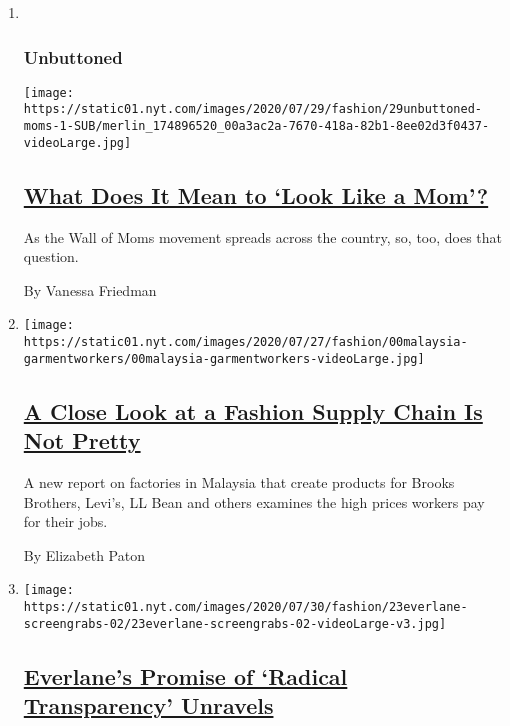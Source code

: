 \begin{enumerate}
\def\labelenumi{\arabic{enumi}.}
\item ~
  \hypertarget{unbuttoned}{%
  \subsubsection{Unbuttoned}\label{unbuttoned}}

  \texttt{[image: https://static01.nyt.com/images/2020/07/29/fashion/29unbuttoned-moms-1-SUB/merlin\_174896520\_00a3ac2a-7670-418a-82b1-8ee02d3f0437-videoLarge.jpg]}

  \hypertarget{what-does-it-mean-to-look-like-a-mom}{%
  \subsection{\texorpdfstring{\href{/2020/07/28/style/wall-of-moms-image.html}{What
  Does It Mean to `Look Like a
  Mom'?}}{What Does It Mean to `Look Like a Mom'?}}\label{what-does-it-mean-to-look-like-a-mom}}

  As the Wall of Moms movement spreads across the country, so, too, does
  that question.

  By Vanessa Friedman
\item
  \texttt{[image: https://static01.nyt.com/images/2020/07/27/fashion/00malaysia-garmentworkers/00malaysia-garmentworkers-videoLarge.jpg]}

  \hypertarget{a-close-look-at-a-fashion-supply-chain-is-not-pretty}{%
  \subsection{\texorpdfstring{\href{/2020/07/28/style/malaysia-forced-labor-garment-workers.html}{A
  Close Look at a Fashion Supply Chain Is Not
  Pretty}}{A Close Look at a Fashion Supply Chain Is Not Pretty}}\label{a-close-look-at-a-fashion-supply-chain-is-not-pretty}}

  A new report on factories in Malaysia that create products for Brooks
  Brothers, Levi's, LL Bean and others examines the high prices workers
  pay for their jobs.

  By Elizabeth Paton
\item
  \texttt{[image: https://static01.nyt.com/images/2020/07/30/fashion/23everlane-screengrabs-02/23everlane-screengrabs-02-videoLarge-v3.jpg]}

  \hypertarget{everlanes-promise-of-radical-transparency-unravels}{%
  \subsection{\texorpdfstring{\href{/2020/07/26/fashion/everlane-employees-ethical-clothing.html}{Everlane's
  Promise of `Radical Transparency'
  Unravels}}{Everlane's Promise of `Radical Transparency' Unravels}}\label{everlanes-promise-of-radical-transparency-unravels}}


\end{enumerate}

